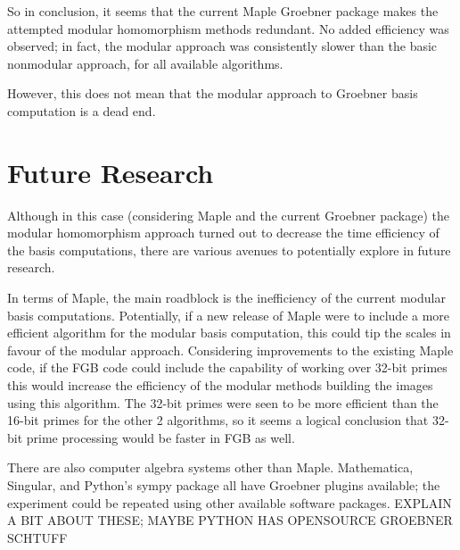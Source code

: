 \documentclass[letterpaper,12pt,titlepage,oneside,final]{book}
\begin{document}
So in conclusion, it seems that the current Maple Groebner package makes the attempted modular homomorphism methods redundant.  No added efficiency was observed; in fact, the modular approach was consistently slower than the basic nonmodular approach, for all available algorithms.  

However, this does not mean that the modular approach to Groebner basis computation is a dead end. 

\section{Future Research}    

Although in this case (considering Maple and the current Groebner package) the modular homomorphism approach turned out to decrease the time efficiency of the basis computations, there are various avenues to potentially explore in future research.  

In terms of Maple, the main roadblock is the inefficiency of the current modular basis computations.  Potentially, if a new release of Maple were to include a more efficient algorithm for the modular basis computation, this could tip the scales in favour of the modular approach.  Considering improvements to the existing Maple code, if the FGB code could include the capability of working over 32-bit primes this would increase the efficiency of the modular methods building the images using this algorithm.  The 32-bit primes were seen to be more efficient than the 16-bit primes for the other 2 algorithms, so it seems a logical conclusion that 32-bit prime processing would be faster in FGB as well.  

There are also computer algebra systems other than Maple.  Mathematica, Singular, and Python's sympy package all have Groebner plugins available; the experiment could be repeated using other available software packages.  EXPLAIN A BIT ABOUT THESE; MAYBE PYTHON HAS OPENSOURCE GROEBNER SCHTUFF
\end{document}
